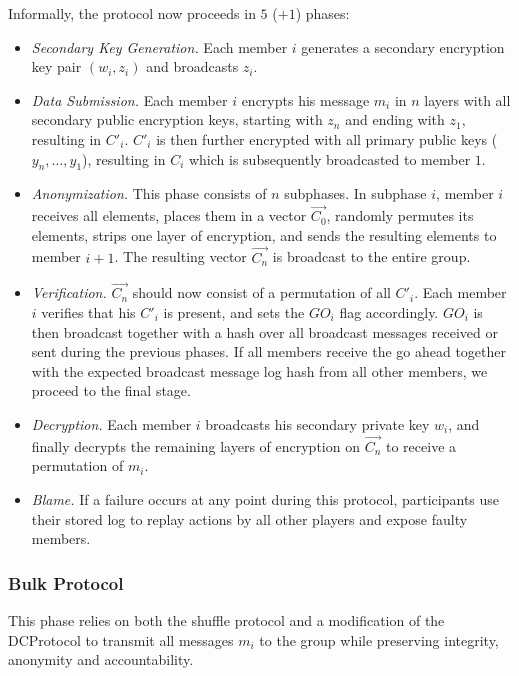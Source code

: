Informally, the protocol now proceeds in $5$ ($ + 1$) phases:

\begin{itemize}
\item \emph{Secondary Key Generation.}
      Each member $i$ generates a secondary encryption key pair $(w_i, z_i)$ and broadcasts $z_i$.
\item \emph{Data Submission.}
      Each member $i$ encrypts his message $m_i$ in $n$ layers with all secondary public encryption keys,
      starting with $z_n$ and ending with $z_1$, resulting in $C'_i$.  $C'_i$ is then further encrypted
      with all primary public keys ($y_n, \ldots, y_1$), resulting in $C_i$ which is subsequently
      broadcasted to member $1$. 
\item \emph{Anonymization.}
      This phase consists of $n$ subphases. In subphase $i$, member $i$ receives all elements,
      places them in a vector $\vec{C_0}$, randomly permutes its elements, strips one layer of
      encryption, and sends the resulting elements to member $i + 1$. The resulting vector $\vec{C_n}$
      is broadcast to the entire group.
\item \emph{Verification.}
      $\vec{C_n}$ should now consist of a permutation of all $C'_i$. Each member $i$ verifies that
      his $C'_i$ is present, and sets the $GO_i$ flag accordingly. $GO_i$ is then broadcast
      together with a hash over all broadcast messages received or sent during the previous phases.
      If all members receive the go ahead together with the expected broadcast message log hash
      from all other members, we proceed to the final stage.
\item \emph{Decryption.}
      Each member $i$ broadcasts his secondary private key $w_i$, and finally decrypts the remaining
      layers of encryption on $\vec{C_n}$ to receive a permutation of $m_i$.
\item \emph{Blame.}
      If a failure occurs at any point during this protocol, participants use their stored
      log to replay actions by all other players and expose faulty members.
\end{itemize}

\subsubsection{Bulk Protocol}

This phase relies on both the shuffle protocol and a modification of the \ac{DCProtocol}
to transmit all messages $m_i$ to the group while preserving integrity, anonymity and accountability.

